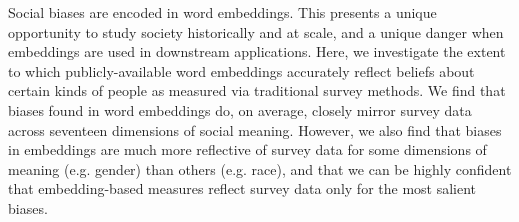 Social biases are encoded in word embeddings. This presents a unique opportunity to study society historically and at scale, and a unique danger when embeddings are used in downstream applications. Here, we investigate the extent to which publicly-available word embeddings accurately reflect beliefs about certain kinds of people as measured via traditional survey methods. We find that biases found in word embeddings do, on average, closely mirror survey data across seventeen dimensions of social meaning. However, we also find that biases in embeddings are much more reflective of survey data for some dimensions of meaning (e.g. gender) than others (e.g. race), and that we can be highly confident that embedding-based measures reflect survey data only for the most salient biases.
